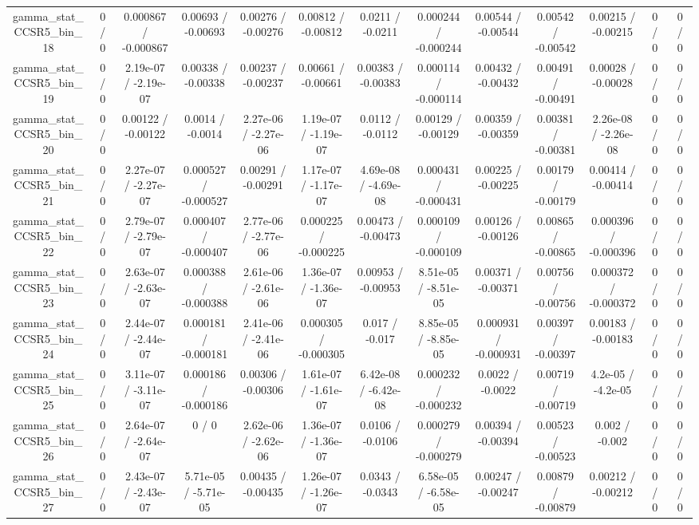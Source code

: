 \documentclass[10pt]{article}
\begin{document}
\begin{table}[htbp]
\begin{center}
\begin{tabular}{|c|c|c|c|c|c|c|c|c|c|c|c|c|}
  gamma_stat_CCSR5_bin_18 & 0 / 0 & 0.000867 / -0.000867 & 0.00693 / -0.00693 & 0.00276 / -0.00276 & 0.00812 / -0.00812 & 0.0211 / -0.0211 & 0.000244 / -0.000244 & 0.00544 / -0.00544 & 0.00542 / -0.00542 & 0.00215 / -0.00215 & 0 / 0 & 0 / 0 \\ 
  gamma_stat_CCSR5_bin_19 & 0 / 0 & 2.19e-07 / -2.19e-07 & 0.00338 / -0.00338 & 0.00237 / -0.00237 & 0.00661 / -0.00661 & 0.00383 / -0.00383 & 0.000114 / -0.000114 & 0.00432 / -0.00432 & 0.00491 / -0.00491 & 0.00028 / -0.00028 & 0 / 0 & 0 / 0 \\ 
  gamma_stat_CCSR5_bin_20 & 0 / 0 & 0.00122 / -0.00122 & 0.0014 / -0.0014 & 2.27e-06 / -2.27e-06 & 1.19e-07 / -1.19e-07 & 0.0112 / -0.0112 & 0.00129 / -0.00129 & 0.00359 / -0.00359 & 0.00381 / -0.00381 & 2.26e-08 / -2.26e-08 & 0 / 0 & 0 / 0 \\ 
  gamma_stat_CCSR5_bin_21 & 0 / 0 & 2.27e-07 / -2.27e-07 & 0.000527 / -0.000527 & 0.00291 / -0.00291 & 1.17e-07 / -1.17e-07 & 4.69e-08 / -4.69e-08 & 0.000431 / -0.000431 & 0.00225 / -0.00225 & 0.00179 / -0.00179 & 0.00414 / -0.00414 & 0 / 0 & 0 / 0 \\ 
  gamma_stat_CCSR5_bin_22 & 0 / 0 & 2.79e-07 / -2.79e-07 & 0.000407 / -0.000407 & 2.77e-06 / -2.77e-06 & 0.000225 / -0.000225 & 0.00473 / -0.00473 & 0.000109 / -0.000109 & 0.00126 / -0.00126 & 0.00865 / -0.00865 & 0.000396 / -0.000396 & 0 / 0 & 0 / 0 \\ 
  gamma_stat_CCSR5_bin_23 & 0 / 0 & 2.63e-07 / -2.63e-07 & 0.000388 / -0.000388 & 2.61e-06 / -2.61e-06 & 1.36e-07 / -1.36e-07 & 0.00953 / -0.00953 & 8.51e-05 / -8.51e-05 & 0.00371 / -0.00371 & 0.00756 / -0.00756 & 0.000372 / -0.000372 & 0 / 0 & 0 / 0 \\ 
  gamma_stat_CCSR5_bin_24 & 0 / 0 & 2.44e-07 / -2.44e-07 & 0.000181 / -0.000181 & 2.41e-06 / -2.41e-06 & 0.000305 / -0.000305 & 0.017 / -0.017 & 8.85e-05 / -8.85e-05 & 0.000931 / -0.000931 & 0.00397 / -0.00397 & 0.00183 / -0.00183 & 0 / 0 & 0 / 0 \\ 
  gamma_stat_CCSR5_bin_25 & 0 / 0 & 3.11e-07 / -3.11e-07 & 0.000186 / -0.000186 & 0.00306 / -0.00306 & 1.61e-07 / -1.61e-07 & 6.42e-08 / -6.42e-08 & 0.000232 / -0.000232 & 0.0022 / -0.0022 & 0.00719 / -0.00719 & 4.2e-05 / -4.2e-05 & 0 / 0 & 0 / 0 \\ 
  gamma_stat_CCSR5_bin_26 & 0 / 0 & 2.64e-07 / -2.64e-07 & 0 / 0 & 2.62e-06 / -2.62e-06 & 1.36e-07 / -1.36e-07 & 0.0106 / -0.0106 & 0.000279 / -0.000279 & 0.00394 / -0.00394 & 0.00523 / -0.00523 & 0.002 / -0.002 & 0 / 0 & 0 / 0 \\ 
  gamma_stat_CCSR5_bin_27 & 0 / 0 & 2.43e-07 / -2.43e-07 & 5.71e-05 / -5.71e-05 & 0.00435 / -0.00435 & 1.26e-07 / -1.26e-07 & 0.0343 / -0.0343 & 6.58e-05 / -6.58e-05 & 0.00247 / -0.00247 & 0.00879 / -0.00879 & 0.00212 / -0.00212 & 0 / 0 & 0 / 0 \\ 

\end{tabular}
\end{center}
\end{table}
\end{document}
